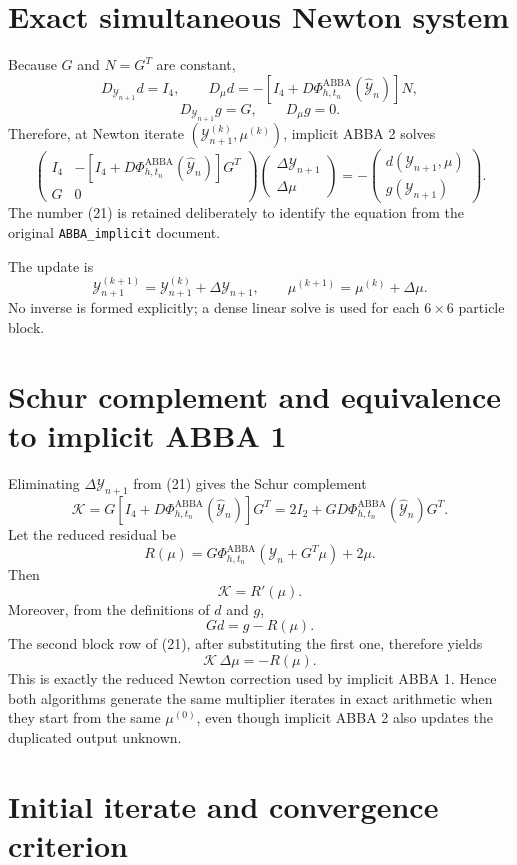 \documentclass[11pt,a4paper]{article}
\newcommand{\Id}{I}
\newcommand{\Y}{\mathcal{Y}}
\newcommand{\PhiAB}{\Phi^{\mathrm{ABBA}}_{h,t_n}}
\begin{document}
\section{Exact simultaneous Newton system}

Because $G$ and $N=G^T$ are constant,
\[
 D_{\Y_{n+1}}d=\Id_4,
 \qquad
 D_\mu d=-\left[\Id_4+D\PhiAB(\widehat{\Y}_n)\right]N,
\]
\[
 D_{\Y_{n+1}}g=G,
 \qquad
 D_\mu g=0.
\]
Therefore, at Newton iterate $(\Y_{n+1}^{(k)},\mu^{(k)})$, implicit ABBA 2
solves
\[
 \boxed{
 \begin{pmatrix}
  \Id_4&-\left[\Id_4+D\PhiAB(\widehat{\Y}_n)\right]G^T\\[2pt]
  G&0
 \end{pmatrix}
 \begin{pmatrix}
  \Delta\Y_{n+1}\\
  \Delta\mu
 \end{pmatrix}
 =-
 \begin{pmatrix}
  d(\Y_{n+1},\mu)\\
  g(\Y_{n+1})
 \end{pmatrix}.
 } \tag{21}
\]
The number (21) is retained deliberately to identify the equation from the
original \texttt{ABBA\_implicit} document.

The update is
\[
 \Y_{n+1}^{(k+1)}=\Y_{n+1}^{(k)}+\Delta\Y_{n+1},
 \qquad
 \mu^{(k+1)}=\mu^{(k)}+\Delta\mu.
\]
No inverse is formed explicitly; a dense linear solve is used for each
$6\times6$ particle block.

\section{Schur complement and equivalence to implicit ABBA 1}

Eliminating $\Delta\Y_{n+1}$ from (21) gives the Schur complement
\[
 \mathcal K
 =G\left[\Id_4+D\PhiAB(\widehat{\Y}_n)\right]G^T
 =2\Id_2+GD\PhiAB(\widehat{\Y}_n)G^T.
\]
Let the reduced residual be
\[
 R(\mu)=G\PhiAB(\Y_n+G^T\mu)+2\mu.
\]
Then
\[
 \mathcal K=R'(\mu).
\]
Moreover, from the definitions of $d$ and $g$,
\[
 Gd=g-R(\mu).
\]
The second block row of (21), after substituting the first one, therefore yields
\[
 \mathcal K\,\Delta\mu=-R(\mu).
\]
This is exactly the reduced Newton correction used by implicit ABBA 1. Hence both
algorithms generate the same multiplier iterates in exact arithmetic when they start
from the same $\mu^{(0)}$, even though implicit ABBA 2 also updates the duplicated
output unknown.

\section{Initial iterate and convergence criterion}
\end{document}
